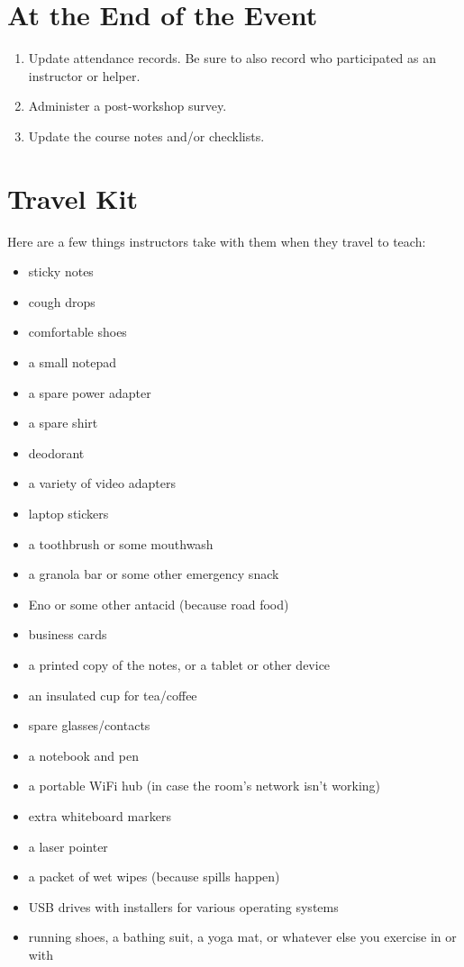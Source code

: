 \section{At the End of the Event}\label{at-the-end-of-the-event}

\begin{enumerate}
\item
  Update attendance records. Be sure to also record who participated
  as an instructor or helper.
\item
  Administer a post-workshop survey.
\item
  Update the course notes and/or checklists.
\end{enumerate}

\section{Travel Kit}\label{travel-kit}

Here are a few things instructors take with them when they travel to
teach:

\begin{itemize}
\item
  sticky notes
\item
  cough drops
\item
  comfortable shoes
\item
  a small notepad
\item
  a spare power adapter
\item
  a spare shirt
\item
  deodorant
\item
  a variety of video adapters
\item
  laptop stickers
\item
  a toothbrush or some mouthwash
\item
  a granola bar or some other emergency snack
\item
  Eno or some other antacid (because road food)
\item
  business cards
\item
  a printed copy of the notes, or a tablet or other device
\item
  an insulated cup for tea/coffee
\item
  spare glasses/contacts
\item
  a notebook and pen
\item
  a portable WiFi hub (in case the room's network isn't working)
\item
  extra whiteboard markers
\item
  a laser pointer
\item
  a packet of wet wipes (because spills happen)
\item
  USB drives with installers for various operating systems
\item
  running shoes, a bathing suit, a yoga mat, or whatever else you
  exercise in or with
\end{itemize}

